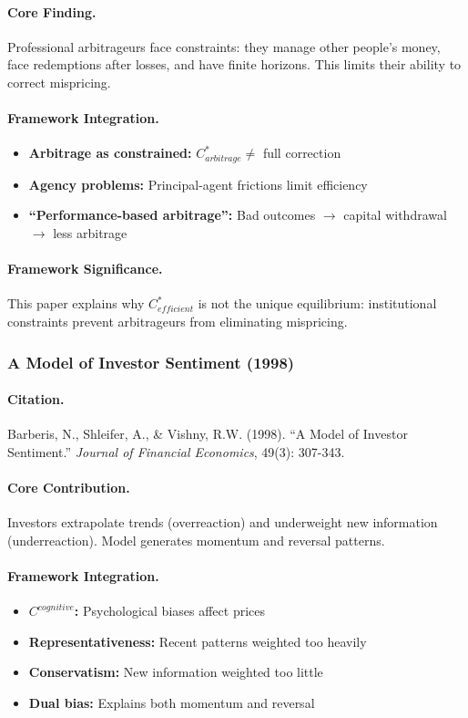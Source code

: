 \paragraph{Core Finding.}
Professional arbitrageurs face constraints: they manage other people's money,
face redemptions after losses, and have finite horizons. This limits their
ability to correct mispricing.

\paragraph{Framework Integration.}
\begin{itemize}
  \item \textbf{Arbitrage as constrained:} $C^*_{arbitrage} \neq$ full correction
  \item \textbf{Agency problems:} Principal-agent frictions limit efficiency
  \item \textbf{``Performance-based arbitrage'':} Bad outcomes $\to$ capital withdrawal $\to$ less arbitrage
\end{itemize}

\paragraph{Framework Significance.}
This paper explains why $C^*_{efficient}$ is not the unique equilibrium:
institutional constraints prevent arbitrageurs from eliminating mispricing.

\subsubsection{A Model of Investor Sentiment (1998)}

\paragraph{Citation.}
Barberis, N., Shleifer, A., \& Vishny, R.W. (1998).
``A Model of Investor Sentiment.''
\emph{Journal of Financial Economics}, 49(3): 307-343.

\paragraph{Core Contribution.}
Investors extrapolate trends (overreaction) and underweight new information
(underreaction). Model generates momentum and reversal patterns.

\paragraph{Framework Integration.}
\begin{itemize}
  \item \textbf{$C^{cognitive}$:} Psychological biases affect prices
  \item \textbf{Representativeness:} Recent patterns weighted too heavily
  \item \textbf{Conservatism:} New information weighted too little
  \item \textbf{Dual bias:} Explains both momentum and reversal
\end{itemize}

